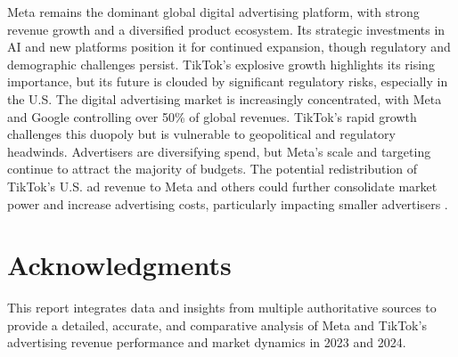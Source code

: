 \documentclass{article}
\begin{document}
Meta remains the dominant global digital advertising platform, with strong revenue growth and a diversified product ecosystem. Its strategic investments in AI and new platforms position it for continued expansion, though regulatory and demographic challenges persist. TikTok's explosive growth highlights its rising importance, but its future is clouded by significant regulatory risks, especially in the U.S. The digital advertising market is increasingly concentrated, with Meta and Google controlling over 50\% of global revenues. TikTok's rapid growth challenges this duopoly but is vulnerable to geopolitical and regulatory headwinds. Advertisers are diversifying spend, but Meta's scale and targeting continue to attract the majority of budgets. The potential redistribution of TikTok's U.S. ad revenue to Meta and others could further consolidate market power and increase advertising costs, particularly impacting smaller advertisers \cite{martech_meta_tiktok,cb_tiktok_ban}.

\section*{Acknowledgments}

This report integrates data and insights from multiple authoritative sources to provide a detailed, accurate, and comparative analysis of Meta and TikTok’s advertising revenue performance and market dynamics in 2023 and 2024.



\end{document}
